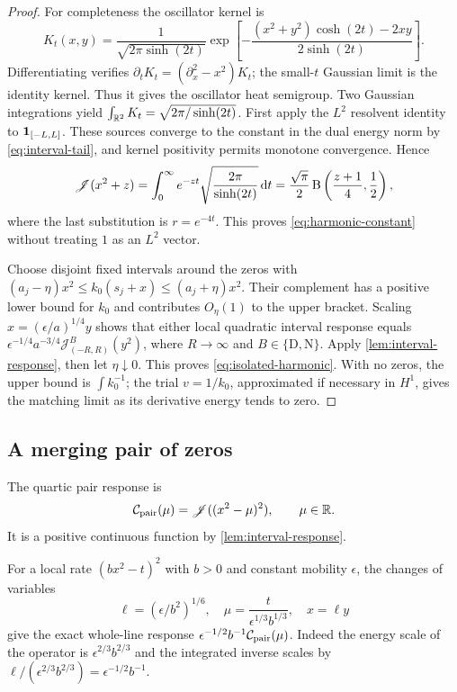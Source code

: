\begin{proof}
For completeness the oscillator kernel is
\[
 K_t(x,y)=\frac{1}{\sqrt{2\pi\sinh(2t)}}
 \exp\left[-\frac{(x^2+y^2)\cosh(2t)-2xy}{2\sinh(2t)}\right].
\]
Differentiating verifies $\partial_tK_t=(\partial_x^2-x^2)K_t$;
the small-$t$ Gaussian limit is the identity kernel. Thus it gives
the oscillator heat semigroup. Two Gaussian integrations yield
$\int_{\mathbb R^2}K_t=\sqrt{2\pi/\sinh(2t)}$. First apply the $L^2$
resolvent identity to $\mathbf 1_{[-L,L]}$. These sources converge to the
constant in the dual energy norm by \eqref{eq:interval-tail}, and
kernel positivity permits monotone convergence. Hence
\[
 \mathscr J(x^2+z)=\int_0^\infty e^{-zt}
             \sqrt{\frac{2\pi}{\sinh(2t)}}\,\mathrm d t
 =\frac{\sqrt\pi}{2}\operatorname{B}\left(\frac{z+1}{4},\frac12\right),
\]
where the last substitution is $r=e^{-4t}$. This proves
\eqref{eq:harmonic-constant} without treating $1$ as an $L^2$ vector.

Choose disjoint fixed intervals around the zeros with
$(a_j-\eta)x^2\le k_0(s_j+x)\le(a_j+\eta)x^2$.
Their complement has a positive lower bound for $k_0$ and contributes
$O_\eta(1)$ to the upper bracket. Scaling $x=(\epsilon/a)^{1/4}y$
shows that either local quadratic interval response equals
$\epsilon^{-1/4}a^{-3/4}\mathscr J_{(-R,R)}^B(y^2)$, where
$R\to\infty$ and $B\in\{\mathrm D,\mathrm N\}$.
Apply \cref{lem:interval-response}, then let $\eta\downarrow0$.
This proves \eqref{eq:isolated-harmonic}. With no zeros, the upper bound
is $\int k_0^{-1}$; the trial $v=1/k_0$, approximated if necessary in
$H^1$, gives the matching limit as its derivative energy tends to zero.
\end{proof}

\subsection{A merging pair of zeros}
\begin{definition}\label{def:pair-response}
The quartic pair response is
\begin{equation}\label{eq:pair-definition}
 \mathcal C_{\rm pair}(\mu)=\mathscr J((x^2-\mu)^2),\qquad \mu\in\mathbb R.
\end{equation}
It is a positive continuous function by \cref{lem:interval-response}.
\end{definition}
For a local rate $(bx^2-t)^2$ with $b>0$ and constant mobility
$\epsilon$, the changes of variables
\begin{equation}\label{eq:fold-scaling}
 \ell=(\epsilon/b^2)^{1/6},\quad
 \mu=\frac{t}{\epsilon^{1/3}b^{1/3}},\quad x=\ell y
\end{equation}
give the exact whole-line response
$\epsilon^{-1/2}b^{-1}\mathcal C_{\rm pair}(\mu)$.
Indeed the energy scale of the operator is
$\epsilon^{2/3}b^{2/3}$ and the integrated inverse scales by
$\ell/(\epsilon^{2/3}b^{2/3})=\epsilon^{-1/2}b^{-1}$.

